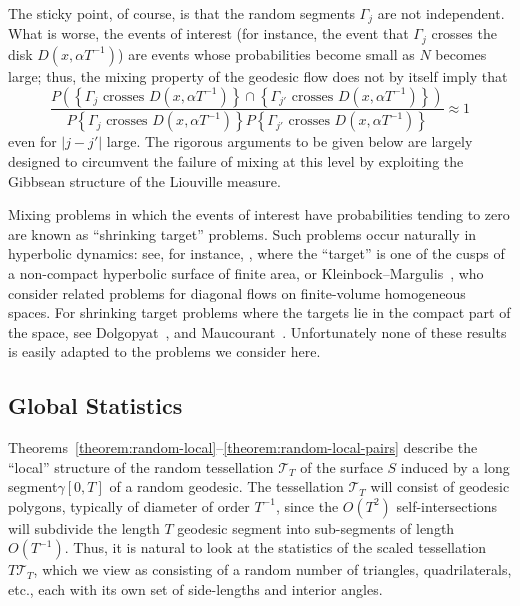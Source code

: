 \documentclass[AHL, Unicode, longabstracts, published]{cedram}
\newcommand{\xset}[1]{\left\{ #1 \right\}}
\begin{document}
The sticky point, of course, is that the random segments $\Gamma_{j}$ are not independent. What is worse, the events of interest (for instance, the event that $\Gamma_{j}$ crosses the disk $D(x,\alpha T^{-1})$) are events whose probabilities become small as $N$ becomes large; thus, the mixing property of the geodesic flow does not by itself imply that
\[
\frac{P (\xset {\Gamma_{j} \text{ crosses } D(x,\alpha T^{-1})}\cap \xset {\Gamma_{j'} \text{ crosses } D(x,\alpha T^{-1})})}{P \xset {\Gamma_{j} \text{ crosses } D(x,\alpha T^{-1})}P \xset {\Gamma_{j'} \text { crosses }D(x,\alpha T^{-1})}} \approx 1
\]
even for $|j-j'| $ large. The rigorous arguments to be given below are largely designed to circumvent the failure of mixing at this level by exploiting the Gibbsean structure of the Liouville measure.

Mixing problems in which the events of interest have probabilities tending to zero are known as ``shrinking target'' problems. Such problems occur naturally in hyperbolic dynamics: see, for instance, \cite{Sullivan}, where the ``target'' is one of the cusps of a non-compact hyperbolic surface of finite area, or Kleinbock--Margulis~\cite{KM}, who consider related problems for diagonal flows on finite-volume homogeneous spaces. For shrinking target problems where the targets lie in the compact part of the space, see Dolgopyat~\cite{Dolgopyat2}, and Maucourant~\cite{Maucourant}. Unfortunately none of these results is easily adapted to the problems we consider here.



\subsection{Global Statistics}\label{ssec:global}

Theorems~\ref{theorem:random-local}--\ref{theorem:random-local-pairs} describe the ``local'' structure of the random tessellation $\mathcal{T}_{T}$ of the surface $S$ induced by a long segment$\gamma[0,T]$ of a random geodesic. The tessellation $\mathcal{T}_{T}$ will consist of geodesic polygons, typically of diameter of order $T^{-1}$, since the $O (T^{2})$ self-intersections will subdivide the length $T$ geodesic segment into sub-segments of length $O (T^{-1})$. Thus, it is natural to look at the statistics of the scaled tessellation $T\mathcal{T}_{T}$, which we view as consisting of a random number of triangles, quadrilaterals, etc., each with its own set of side-lengths and interior angles.
\end{document}
